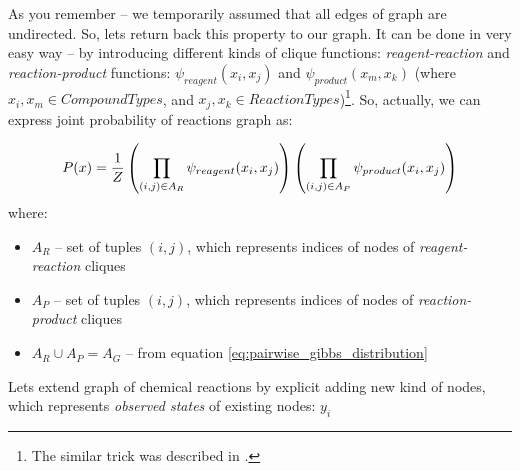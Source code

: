 \documentclass[10pt]{article}
\begin{document}
As you remember -- we temporarily assumed that all edges of graph are undirected. So, lets return back this property to our graph. It can be done in very easy way -- by introducing different kinds of clique functions: \emph{reagent-reaction} and \emph{reaction-product} functions: $\psi_{reagent}(x_i, x_j)$ and $\psi_{product}(x_m, x_k)$ (where $x_i, x_m \in CompoundTypes$, and $x_j, x_k \in ReactionTypes$)\footnote{The similar trick was described in \cite{fraud_detection}.}. So, actually, we can express joint probability of reactions graph as:

\begin{equation}
P(x) = {1 \over Z} \left( \prod_{(i,j) \in A_R} \psi_{reagent}(x_i, x_j) \right) \left( \prod_{(i,j) \in A_P} \psi_{product}(x_i, x_j) \right)
\end{equation}
where:
\begin{itemize}
    \setlength \itemsep{0em}
    \item $A_R$ -- set of tuples $(i,j)$, which represents indices of nodes of \emph{reagent-reaction} cliques
    \item $A_P$ -- set of tuples $(i,j)$, which represents indices of nodes of \emph{reaction-product} cliques
    \item $A_R \cup A_P = A_G$ -- from equation \eqref{eq:pairwise_gibbs_distribution}
\end{itemize}

Lets extend graph of chemical reactions by explicit adding new kind of nodes, which represents \emph{observed states} of existing nodes: $y_i$
\end{document}
